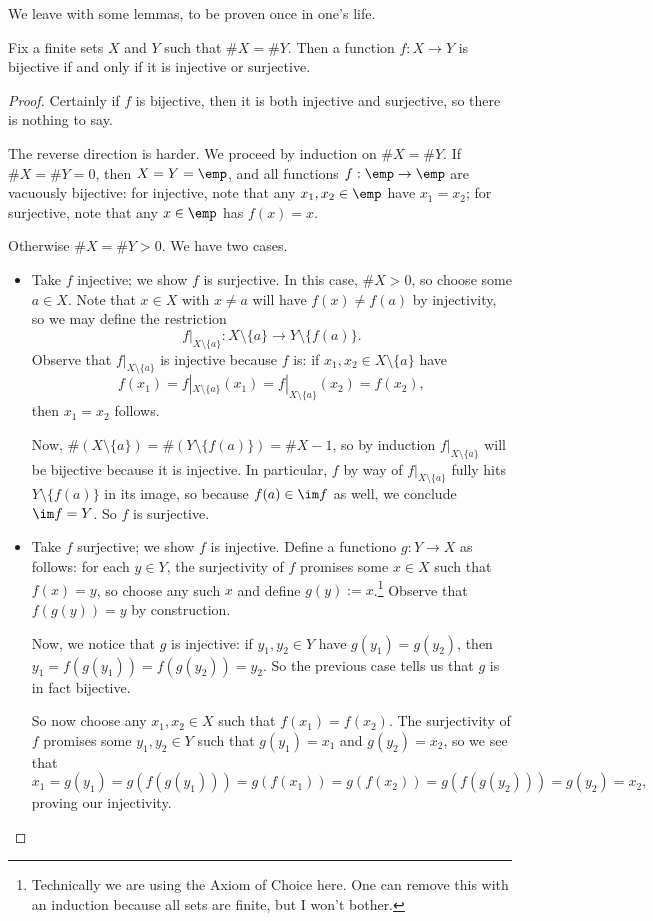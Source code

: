 We leave with some lemmas, to be proven once in one's life.
\begin{lemma}
	Fix a finite sets $X$ and $Y$ such that $\#X=\#Y$. Then a function $f:X\to Y$ is bijective if and only if it is injective or surjective.
\end{lemma}
\begin{proof}
	Certainly if $f$ is bijective, then it is both injective and surjective, so there is nothing to say.
	
	The reverse direction is harder. We proceed by induction on $\#X=\#Y$. If $\#X=\#Y=0$, then $X=Y=\emp$, and all functions $f:\emp\to\emp$ are vacuously bijective: for injective, note that any $x_1,x_2\in\emp$ have $x_1=x_2$; for surjective, note that any $x\in\emp$ has $f(x)=x$.

	Otherwise $\#X=\#Y>0$. We have two cases.
	\begin{itemize}
		\item Take $f$ injective; we show $f$ is surjective. In this case, $\#X>0$, so choose some $a\in X$. Note that $x\in X$ with $x\ne a$ will have $f(x)\ne f(a)$ by injectivity, so we may define the restriction
		\[f|_{X\setminus\{a\}}:X\setminus\{a\}\to Y\setminus\{f(a)\}.\]
		Observe that $f|_{X\setminus\{a\}}$ is injective because $f$ is: if $x_1,x_2\in X\setminus\{a\}$ have
		\[f(x_1)=f|_{X\setminus\{a\}}(x_1)=f|_{X\setminus\{a\}}(x_2)=f(x_2),\]
		then $x_1=x_2$ follows.
		
		Now, $\#(X\setminus\{a\})=\#(Y\setminus\{f(a)\})=\#X-1$, so by induction $f|_{X\setminus\{a\}}$ will be bijective because it is injective. In particular, $f$ by way of $f|_{X\setminus\{a\}}$ fully hits $Y\setminus\{f(a)\}$ in its image, so because $f(a)\in\im f$ as well, we conclude $\im f=Y$. So $f$ is surjective.

		\item Take $f$ surjective; we show $f$ is injective. Define a functiono $g:Y\to X$ as follows: for each $y\in Y$, the surjectivity of $f$ promises some $x\in X$ such that $f(x)=y$, so choose any such $x$ and define $g(y):=x$.\footnote{Technically we are using the Axiom of Choice here. One can remove this with an induction because all sets are finite, but I won't bother.} Observe that $f(g(y))=y$ by construction.

		Now, we notice that $g$ is injective: if $y_1,y_2\in Y$ have $g(y_1)=g(y_2)$, then $y_1=f(g(y_1))=f(g(y_2))=y_2$. So the previous case tells us that $g$ is in fact bijective.

		So now choose any $x_1,x_2\in X$ such that $f(x_1)=f(x_2)$. The surjectivity of $f$ promises some $y_1,y_2\in Y$ such that $g(y_1)=x_1$ and $g(y_2)=x_2$, so we see that
		\[x_1=g(y_1)=g(f(g(y_1)))=g(f(x_1))=g(f(x_2))=g(f(g(y_2)))=g(y_2)=x_2,\]
		proving our injectivity.
		\qedhere
	\end{itemize}
\end{proof}
